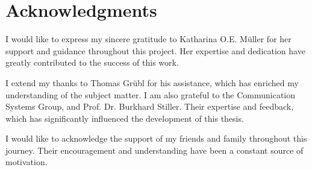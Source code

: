 \chapter*{Acknowledgments}

I would like to express my sincere gratitude to Katharina O.E. Müller for her support and guidance throughout this project. Her expertise and dedication have greatly contributed to the success of this work.

I extend my thanks to Thomas Grübl for his assistance, which has enriched my understanding of the subject matter.
I am also grateful to the Communication Systems Group, and Prof. Dr. Burkhard Stiller. Their expertise and feedback, which has significantly influenced the development of this thesis.

I would like to acknowledge the support of my friends and family throughout this journey. Their encouragement and understanding have been a constant source of motivation.